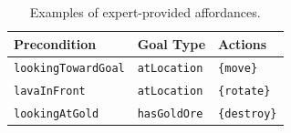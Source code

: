 \documentclass[letterpaper]{article}
\newcommand{\ra}[1]{\renewcommand{\arraystretch}{#1}} %
\begin{document}




\begin{table}[t]
\ra{1.15}
\small
\centering
\begin{tabular}{@{}lll}\toprule
Precondition & Goal Type & Actions \\ \midrule
\texttt{lookingTowardGoal} & \texttt{atLocation} & \texttt{\{move\}} \\
\texttt{lavaInFront} & \texttt{atLocation} & \texttt{\{rotate\}} \\
\texttt{lookingAtGold} & \texttt{hasGoldOre} & \texttt{\{destroy\}} \\
\bottomrule
\end{tabular}

\caption{Examples of expert-provided affordances.\label{table:afford_kb_exp}}
\end{table}


\end{document}
